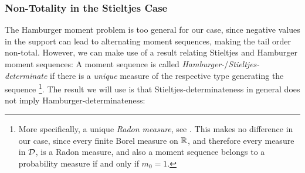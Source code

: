 \documentclass[a4paper]{scrreprt}
\theoremstyle{definition}
\newtheorem{thm}{Theorem}[chapter] %
\begin{document}
%    

    \subsubsection{Non-Totality in the Stieltjes Case}
    The Hamburger moment problem is too general for our case, since negative values in the support can lead to alternating moment sequences, making the tail order non-total.
    However, we can make use of a result relating Stieltjes and Hamburger moment sequences:
    A moment sequence is called \emph{Hamburger-}/\emph{Stieltjes-determinate} if there is a \emph{unique} measure of the respective type generating the sequence \cite[p.68]{bib:schmuedgenTheMomentProblem}
    \footnote{More specifically, a unique \emph{Radon measure}, see \cite[A.1]{bib:schmuedgenTheMomentProblem}. This makes no difference in our case, since every finite Borel measure on $\mathbb{R}$, and therefore every measure in $\mathcal{D}$, is a Radon measure, and also a moment sequence belongs to a probability measure if and only if $m_0 = 1$.}.
    The result we will use is that Stieltjes-determinateness in general does not imply Hamburger-determinateness:
    
\end{document}
